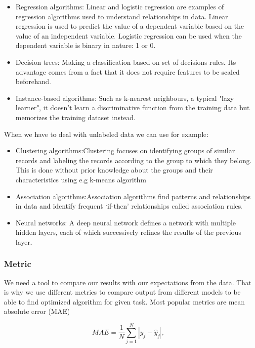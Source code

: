 \documentclass[a4paper,oneside,openright,11pt]{book}
\begin{document}
\begin{itemize}
    \item Regression algorithms: Linear and logistic regression are examples of regression algorithms used to understand relationships in data. Linear regression is used to predict the value of a dependent variable based on the value of an independent variable. Logistic regression can be used when the dependent variable is binary in nature: 1 or 0.
    \item Decision trees: Making a classification based on set of decisions rules. Its advantage comes from a fact that it does not require features to be scaled beforehand.
    \item Instance-based algorithms: Such as k-nearest neighbours, a typical "lazy learner", it doesn't learn a discriminative function from the training data but memorizes the training dataset instead.
\end{itemize}

When we have to deal with unlabeled data we can use for example:

\begin{itemize}
    \item Clustering algorithms:Clustering focuses on identifying groups of similar records and labeling the records according to the group to which they belong. This is done without prior knowledge about the groups and their characteristics using e.g k-means algorithm
    \item Association algorithms:Association algorithms find patterns and relationships in data and identify frequent ‘if-then’ relationships called association rules.
    \item Neural networks:  A deep neural network defines a network with multiple hidden layers, each of which successively refines the results of the previous layer. 
\end{itemize}

\subsubsection{Metric}

We need a tool to compare our results with our expectations from the data. That is why we use different metrics to compare output from different models to be able to find optimized algorithm for given task. Most popular metrics are mean absolute error (MAE)

\begin{equation}
    MAE = \frac{1}{N}\sum_{j=1}^{N}|y_{j} - \hat{y}_{j}|,
\end{equation}
\end{document}
